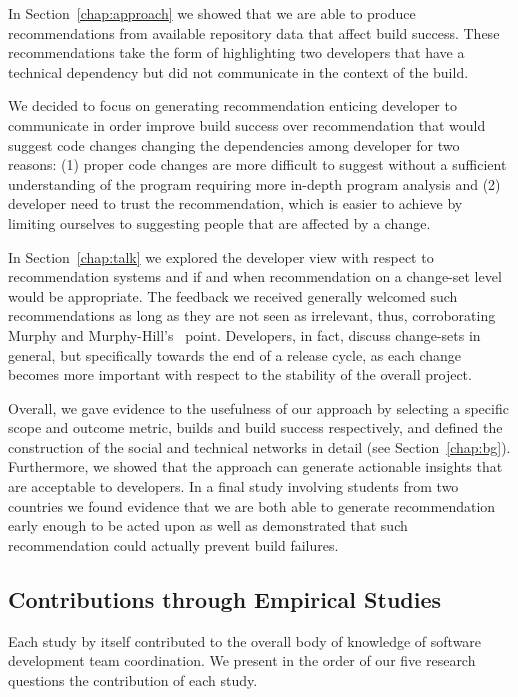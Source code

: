 In Section~\ref{chap:approach} we showed that we are able to produce recommendations from available repository data that affect build success.
These recommendations take the form of highlighting two developers that have a technical dependency but did not communicate in the context of the build.

We decided to focus on generating recommendation enticing developer to communicate in order improve build success over recommendation that would suggest code changes changing the dependencies among developer for two reasons:
(1) proper code changes are more difficult to suggest without a sufficient understanding of the program requiring more in-depth program analysis and 
(2) developer need to trust the recommendation, which is easier to achieve by limiting ourselves to suggesting people that are affected by a change.

In Section~\ref{chap:talk} we explored the developer view with respect to recommendation systems and if and when recommendation on a change-set level would be appropriate.
The feedback we received generally welcomed such recommendations as long as they are not seen as irrelevant, thus, corroborating Murphy and Murphy-Hill's~\cite{murphy:rsse:2010} point.
Developers, in fact, discuss change-sets in general, but specifically towards the end of a release cycle, as each change becomes more important with respect to the stability of the overall project.

Overall, we gave evidence to the usefulness of our approach by selecting a specific scope and outcome metric, builds and build success respectively, and defined the construction of the social and technical networks in detail (see Section~\ref{chap:bg}).
Furthermore, we showed that the approach can generate actionable insights that are acceptable to developers.
In a final study involving students from two countries we found evidence that we are both able to generate recommendation early enough to be acted upon as well as demonstrated that such recommendation could actually prevent build failures.



\subsection{Contributions through Empirical Studies}
\label{sec:cont:emp}
Each study by itself contributed to the overall body of knowledge of software development team coordination.
We present in the order of our five research questions the contribution of each  study.



